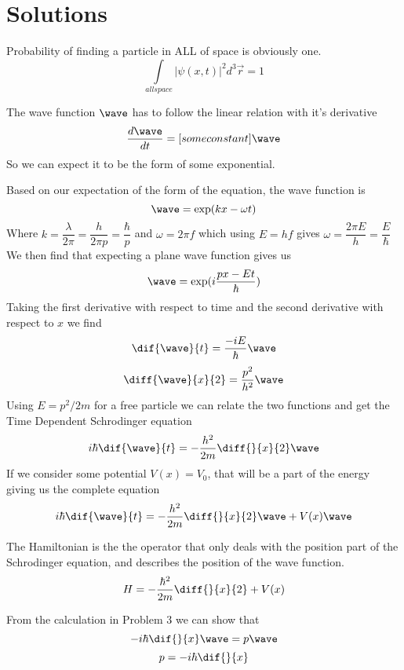 \section{Solutions}
	\begin{ans}
	Probability of finding a particle in ALL of space is obviously one. 
	\[ \int\limits_{all space} | \psi(x,t) | ^2 d^3\vec{r}= 1 \]
\end{ans}
\begin{ans}
	The wave function $ \wave $ has to follow the linear relation with it's derivative
	\[ \frac{d \wave}{dt} = [some constant] \wave \]
	So we can expect it to be the form of some exponential. 
\end{ans}
\begin{ans}
	Based on our expectation of the form of the equation, the wave function is
	\[ \wave = \exp(kx - \omega t) \]
	Where $ k = \dfrac{\lambda}{2 \pi} = \dfrac{h}{2 \pi p} = \dfrac{\hbar}{p}$ and $ \omega = 2 \pi f $ which using $ E = hf $ gives $ \omega = \dfrac{2 \pi E}{h} = \dfrac{E}{\hbar} $
	We then find that expecting a plane wave function gives us 
	\[ \wave = \exp(i\frac{px-Et}{\hbar}) \]
	Taking the first derivative with respect to time and the second derivative with respect to $ x $ we find
	\[ \dif{\wave}{t} =  \frac{-iE}{\hbar} \wave\]
	\[ \diff{\wave}{x}{2} = \frac{p^2}{h^2} \wave\]
	Using $ E = p^2/2m $ for a free particle we can relate the two functions and get the Time Dependent Schrodinger equation
	\[ i\hbar \dif{\wave}{t} = -\frac{h^2}{2m} \diff{}{x}{2} \wave \]
	If we consider some potential $ V(x) = V_0 $, that will be a part of the energy giving us the complete equation
	\[ i\hbar \dif{\wave}{t} = -\frac{h^2}{2m} \diff{}{x}{2} \wave + V(x)\wave\]
\end{ans}
\begin{ans}
	The Hamiltonian is the the operator that only deals with the position part of the Schrodinger equation, and describes the position of the wave function. 
	$$ H = -\frac{\hbar^2}{2m} \diff{}{x}{2}  + V(x) $$
\end{ans}
\begin{ans}
	From the calculation in Problem 3 we can show that
	\[ -i \hbar \dif{}{x} \wave = p \wave \]
	\[ p = -i\hbar \dif{}{x} \]
\end{ans}
